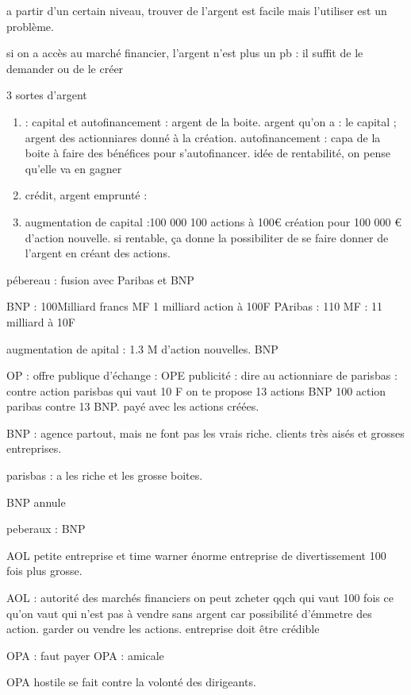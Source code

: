 \documentclass[a4paper,12pt]{article}
\begin{document}
  a partir d'un certain niveau, trouver de l'argent est facile mais l'utiliser est un problème.
  
  si on a accès au marché financier, l'argent n'est plus un pb : il suffit de le demander ou de le créer
  
  
 
 3 sortes d'argent



\begin{enumerate}
	\item : capital et autofinancement : argent de la boite.
	 argent qu'on a : le capital ; argent des actionniares donné à la création.
	autofinancement : capa de la boite à faire des bénéfices pour s'autofinancer.
	idée de rentabilité, on pense qu'elle va en gagner
	\item crédit, argent emprunté :
	\item augmentation de capital :100 000 100 actions à 100€
	création pour 100 000 € d'action nouvelle.
	si rentable, ça donne la possibiliter de se faire donner de l'argent en créant des actions.
\end{enumerate}

pébereau : fusion avec Paribas et BNP

BNP : 100Milliard francs MF  1 milliard action à 100F
PAribas : 110 MF   : 11 milliard à 10F


augmentation de apital : 1.3 M d'action nouvelles.
BNP  


OP : offre publique d'échange : OPE
publicité : dire au actionniare de parisbas : contre action parisbas qui vaut 10 F
on te propose 13 actions BNP 100 action paribas contre 13 BNP.
payé avec les actions créées.

BNP : agence partout, mais ne font pas les vrais riche.
clients très aisés et grosses entreprises.

parisbas : a les riche et les grosse boites.

BNP annule 

peberaux : BNP


AOL petite entreprise et time warner énorme entreprise de divertissement 100 fois plus grosse.

AOL : autorité des marchés financiers
on peut zcheter qqch qui vaut 100 fois ce qu'on vaut qui n'est pas à vendre sans argent car possibilité d'émmetre des action.
garder ou vendre les actions.
entreprise doit être crédible

OPA : faut payer
OPA : amicale 

OPA hostile se fait contre la volonté des dirigeants.
\end{document}
